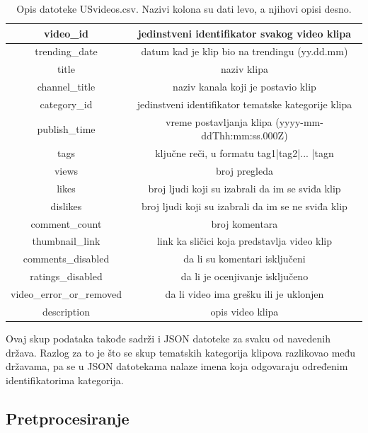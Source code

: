 \documentclass[a4paper]{article}
\theoremstyle{definition}
\begin{document}
\begin{table}[h!]
\centering
\begin{tabular}{ |c|c| } 
 \hline
 video\_id & jedinstveni identifikator svakog video klipa  \\ 
\hline
 trending\_date & datum kad je klip bio na trendingu (yy.dd.mm)  \\ 
\hline
 title & naziv klipa  \\ 
\hline
 channel\_title & naziv kanala koji je postavio klip  \\ 
\hline
 category\_id & jedinstveni identifikator tematske kategorije klipa  \\ 
\hline
publish\_time & vreme postavljanja klipa (yyyy-mm-ddThh:mm:ss.000Z)\\ 
\hline
tags & ključne reči, u formatu tag1|tag2|... |tagn  \\ 
\hline
views & broj pregleda  \\ 
\hline
likes & broj ljudi koji su izabrali da im se sviđa klip\\ 
\hline
dislikes & broj ljudi koji su izabrali da im se ne sviđa klip   \\ 
\hline
comment\_count & broj komentara \\ 
\hline
thumbnail\_link & link ka sličici koja predstavlja video klip  \\ 
\hline
comments\_disabled & da li su komentari isključeni  \\ 
\hline
ratings\_disabled & da li je ocenjivanje isključeno \\ 
\hline
video\_error\_or\_removed & da li video ima grešku ili je uklonjen  \\ 
\hline
description & opis video klipa  \\ 
 \hline
\end{tabular}
\caption{Opis datoteke USvideos.csv. Nazivi kolona su dati levo, a njihovi opisi desno.}
\label{table:1}
\end{table}

Ovaj skup podataka takođe sadrži i JSON datoteke za svaku od navedenih država.
Razlog za to je što se skup tematskih kategorija klipova razlikovao među državama, pa se u JSON datotekama nalaze imena koja odgovaraju određenim identifikatorima kategorija.

\subsection{Pretprocesiranje}
\end{document}
